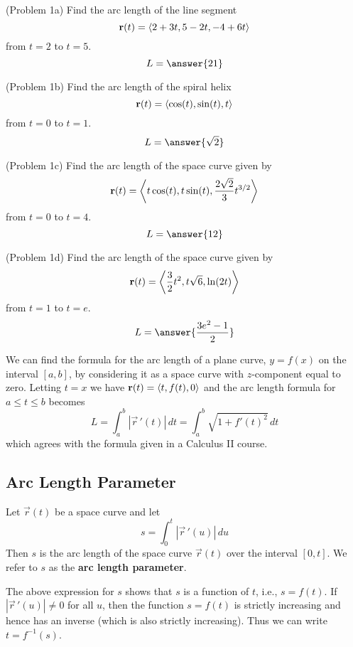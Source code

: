\documentclass[handout]{ximera}
\begin{document}
\begin{problem}(Problem 1a)
Find the arc length of the line segment 
\[
\mathbf r(t) = \left\langle 2 + 3t, 5- 2t, -4 + 6t\right\rangle
\]
from $ t= 2$ to $t = 5$.
\[
L = \answer{21}
\]
\end{problem}


\begin{problem}(Problem 1b)
Find the arc length of the spiral helix 
\[
\mathbf r(t) = \left\langle \cos(t), \sin(t), t\right\rangle
\]
from $ t= 0$ to $t = 1$.
\[
L = \answer{\sqrt 2}
\]
\end{problem}


\begin{problem}(Problem 1c)
Find the arc length of the space curve given by
\[
\mathbf r(t) = \left\langle t\cos(t), t\sin(t), \frac{2\sqrt 2}{3} t^{3/2}\right\rangle
\]
from $ t= 0$ to $t = 4$.
\[
L = \answer{12}
\]
\end{problem}


\begin{problem}(Problem 1d)
Find the arc length of the space curve given by
\[
\mathbf r(t) = \left\langle \frac32 t^2, t\sqrt 6, \ln(2t)\right\rangle
\]
from $ t= 1$ to $t = e$.
\[
L = \answer{\frac{3e^2 -1}{2}}
\]
\end{problem}

We can find the formula for the arc length of a plane curve, $y = f(x)$ on the interval $[a,b]$, by considering it as a space curve with $z$-component equal to zero.
Letting $t = x$ we have $\mathbf r(t) = \left\langle t, f(t), 0\right\rangle$ and the arc length formula for $a \leq t \leq b$ becomes
\[
L = \int_a^b |\vec r\,'(t)| \, dt = \int_a^b \sqrt{1+ f'(t)^2} \, dt
\]
which agrees with the formula given in a Calculus II course.


\subsection{Arc Length Parameter}

Let $\vec r(t) $ be a space curve and let 
\[
s = \int_0^t |\vec r\,'(u)| \, du
\]
Then $s$ is the arc length of the space curve $\vec r(t)$ over the interval $[0, t]$.
We refer to $s$ as the \textbf{arc length parameter}.

The above expression for $s$ shows that $s$ is a function of $t$, i.e., $s = f(t)$.
If $|\vec r\,'(u)| \neq 0$ for all $u$, then the function $s = f(t)$ is strictly increasing and hence has an inverse (which is also strictly increasing).
Thus we can write $t = f^{-1}(s)$.
\end{document}
